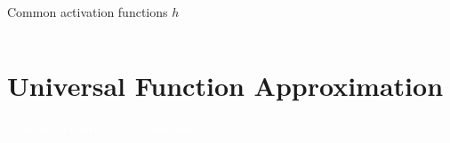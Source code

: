 \documentclass[11pt,table]{beamer}
\begin{document}
\begin{frame}{Common activation functions $h$}
\begin{columns}[T]
\begin{column}{0.4\textwidth}
\begin{itemize}
\end{itemize}
\end{column}
\begin{column}{0.6\textwidth}
\centering
{}
\end{column}
\end{columns}

\end{frame}



\section{Universal Function Approximation}
{
\begin{frame}
\centering
\Huge
\textcolor{white}{Universal Function Approximation}
\thispagestyle{empty}
\end{frame}
}
\end{document}
